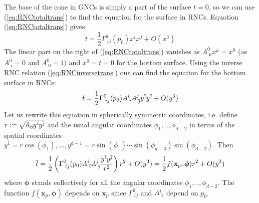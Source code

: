 \documentclass[12pt]{article}
\newcommand{\be}{\begin{equation}}
\newcommand{\ee}{\end{equation}}
\newcommand{\ibar}{{\overline{\emph\i}}}
\newcommand{\jbar}{{\overline{\emph\j}}}
\begin{document}
The base of the cone in GNCs is simply a part of the surface $t=0$, so we can use (\ref{eq:RNCtotaltrans}) to find the equation for the surface in RNCs. Equation (\ref{eq:RNCtotaltrans}) gives
\be\label{eq:BottomSurfaceWithGNC}
\overline{t}=\frac{1}{2}\Gamma^{0}_{\;ij} (p_0)x^i x^j+O ( x^3)
\ee
The linear part on the right of (\ref{eq:RNCtotaltrans}) vanishes as $A^{\overline{0}}_{\;\mu}x^{\mu}=x^0$ (as $A^{\overline{0}}_{\;i}=0$ and $A^{\overline{0}}_{\;0}=1$) and $x^0=t=0$ for the bottom surface. Using the inverse RNC relation (\ref{eq:RNCinversetrans}) one can find the equation for the bottom surface in RNCs:
\be\label{eq:BottomSurface}
\overline{t}=\frac{1}{2}\Gamma^{0}_{\;ij} (p_0)A^{i}_{\;\ibar}A^{j}_{\;\jbar}y^{\ibar} y^{\jbar}+O (y^3)
\ee
Let us rewrite this equation in spherically symmetric coordinates, i.e. define $r:=\sqrt{\delta_{\ibar\jbar}y^\ibar y^\jbar}$ and the usual angular coordinates $\phi_1,..,\phi_{d-2}$ in terms of the spatial coordinates $y^{\overline{1}} = r \cos (\phi_1),\ldots, y^{\overline{d-1}} = r \sin (\phi_1) \cdots \sin (\phi_{d-3}) \sin (\phi_{d-2})$. Then
\be\label{eq:RadialBottomSurface}
\overline{t}=\frac{1}{2}\left (\Gamma^{0}_{\;ij} (p_0)A^{i}_{\;\ibar}A^{j}_{\;\jbar}\frac{y^{\ibar} y^{\jbar}}{r^2}\right)r^2+O (y^3)=\frac{1}{2}f (\mathbf{x}_p,{\boldsymbol\phi})r^2+O (y^3)
\ee
where $\boldsymbol\phi$ stands collectively for all the angular coordinates $\phi_1,..,\phi_{d-2}$. The function $f (\mathbf{x}_p,\boldsymbol\phi)$ depends on $\mathbf{x}_p$ since $\Gamma^{0}_{\;ij}$ and $A^{i}_{\;\ibar}$ depend on $p_0$.
\end{document}
